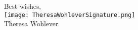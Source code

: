 \documentclass[10pt,letterpaper]{article}
\begin{document}

\hspace*{.6\linewidth} Best wishes, \\
\hspace*{.57\linewidth} \texttt{[image: TheresaWohleverSignature.png]}  {\vspace{-9pt}} \\
\hspace*{.6\linewidth}  Theresa Wohlever
\end{document}
